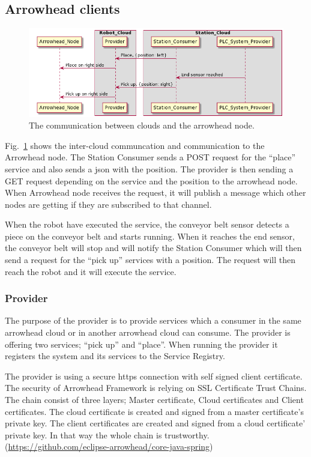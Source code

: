 \subsection{Arrowhead clients}

\begin{figure}[h!]
	\centering
	\includegraphics[scale=0.3]{sections/assets/arrowhead_sequence_diagram.png}
	\caption{The communication between clouds and the arrowhead node.}
	\label{fig:arrowhead_intercloud}
\end{figure}

Fig.~\ref{fig:arrowhead_intercloud} shows the inter-cloud communcation and communication to the Arrowhead node.
The Station Consumer sends a POST request for the ``place'' service and also sends a json with the position.
The provider is then sending a GET request depending on the service and the position to the arrowhead node.
When Arrowhead node receives the request, it will publish a message which other nodes are getting if they are subscribed to that channel.

When the robot have executed the service, the conveyor belt sensor detects a piece on the conveyor belt and starts running.
When it reaches the end sensor, the conveyor belt will stop and will notify the Station Consumer which will then send a request for the ``pick up'' services with a position.
The request will then reach the robot and it will execute the service.

\subsubsection{Provider}
The purpose of the provider is to provide services which a consumer in the same arrowhead cloud or in another arrowhead cloud can consume. The provider is offering two services; ``pick up'' and ``place''.
When running the provider it registers the system and its services to the Service Registry.

The provider is using a secure https connection with self signed client certificate.
The security of Arrowhead Framework is relying on SSL Certificate Trust Chains.
The chain consist of three layers; Master certificate, Cloud certificates and Client certificates.
The cloud certificate is created and signed from a master certificate's private key.
The client certificates are created and signed from a cloud certificate' private key.
In that way the whole chain is trustworthy. (\url{https://github.com/eclipse-arrowhead/core-java-spring})

